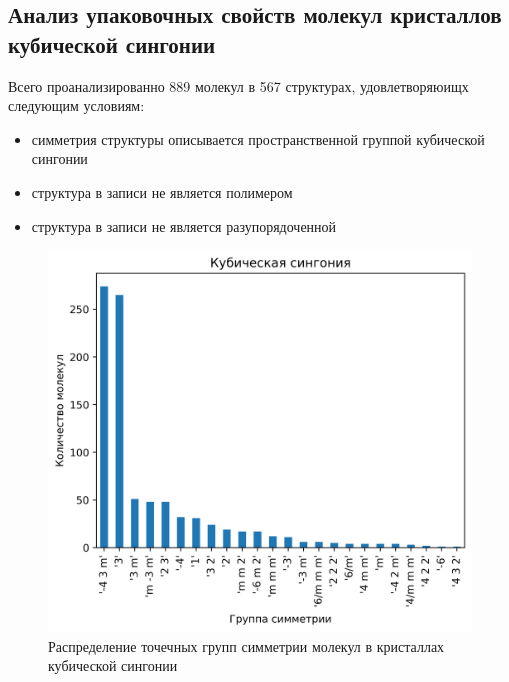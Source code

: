 \documentclass[12pt,a4paper, russian]{extarticle}
\begin{document}
\begin{center}
    \section*{Анализ упаковочных свойств молекул кристаллов кубической сингонии}
\end{center}

Всего проанализированно 889 молекул в 567 структурах, удовлетворяюищх следующим условиям:
\begin{itemize}
\item симметрия структуры описывается пространственной группой кубической сингонии
\item структура в записи не является полимером
\item структура в записи не является разупорядоченной
\end{itemize}

\begin{figure}[H]
\includegraphics[scale=0.8]{plots_sym/cubic_syngony.png}
\caption{Распределение точечных групп симметрии молекул в кристаллах кубической сингонии}
\end{figure}
\end{document}
